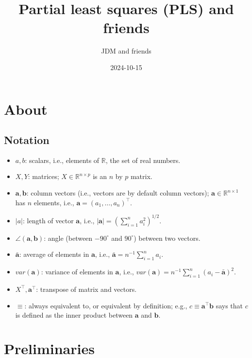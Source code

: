 \documentclass[
]{book}
\title{Partial least squares (PLS) and friends}
\author{JDM and friends}
\date{2024-10-15}
\begin{document}
\maketitle

{
\setcounter{tocdepth}{1}
\tableofcontents
}
\chapter{About}\label{about}

\section{Notation}\label{notation}

\begin{itemize}
\item
  \(a, b\): scalars, i.e., elements of \(\mathbb{R}\), the set of real numbers.
\item
  \(X, Y\): matrices; \(X \in \mathbb{R}^{n\times p}\) is an \(n\) by \(p\) matrix.
\item
  \(\boldsymbol{a}, \boldsymbol{b}\): column vectors (i.e., vectors are by default column vectors); \(\boldsymbol{a} \in \mathbb{R}^{n \times 1}\) has \(n\) elements, i.e., \(\boldsymbol{a} = (a_1,\dots,a_n)^\top\).
\item
  \(\lvert a \rvert\): length of vector \(\boldsymbol{a}\), i.e., \(\lvert \boldsymbol{a} \rvert = \left( \sum_{i=1}^n a_i^2 \right)^{1/2}\).
\item
  \(\angle (\boldsymbol{a}, \boldsymbol{b})\): angle (between \(-90^\circ\) and \(90^\circ\)) between two vectors.
\item
  \(\bar{\boldsymbol{a}}\): average of elements in \(\boldsymbol{a}\), i.e., \(\bar{\boldsymbol{a}} = n^{-1} \sum_{i=1}^n a_i\).
\item
  \(var(\boldsymbol{a})\): variance of elements in \(\boldsymbol{a}\), i.e., \(var(\boldsymbol{a}) = n^{-1} \sum_{i=1}^{n} (a_i - \bar{\boldsymbol{a}})^2\).
\item
  \(X^\top, \boldsymbol{a}^\top\): transpose of matrix and vectors.
\item
  \(\equiv\): always equivalent to, or equivalent by definition; e.g., \(c \equiv \boldsymbol{a}^\top \boldsymbol{b}\) says that \(c\) is defined as the inner product between \(\boldsymbol{a}\) and \(\boldsymbol{b}\).
\end{itemize}

\chapter{Preliminaries}\label{preliminaries}
\end{document}
